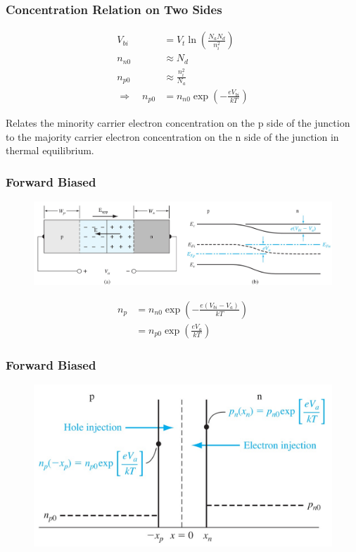 \documentclass{beamer}
\begin{document}
    \begin{frame} \frametitle{Concentration Relation on Two Sides}
        \begin{equation*}
            \begin{aligned}
                V_{bi} &= V_t \ln \left( \frac{N_a N_d}{n_i^2}  \right)\\
                n_{n0} & \approx N_d \\
                n_{p0} & \approx \frac{n_i^2}{N_a}  \\
                \Longrightarrow \quad n_{p0} &= n_{n0} \exp\left( -\frac{e V_{bi} }{kT}  \right)
            \end{aligned}
        \end{equation*}
        \par Relates the minority carrier electron concentration on the p side of the junction to the majority carrier electron concentration on the n side of the junction in thermal equilibrium.
    \end{frame}

    \begin{frame} \frametitle{Forward Biased}
        \begin{figure}[H]
            \centering
            \includegraphics[width=0.9\linewidth]{Forward-biased-equation.jpg}
            \label{fig:Forward-biased-equation.jpg}
        \end{figure}
        \begin{equation*}
            \begin{aligned}
                n_p &= n_{n0} \exp\left( -\frac{e (V_{bi} - V_a)}{kT}  \right) \\
                &= n_{p0} \exp\left( \frac{eV_a}{kT}  \right)
            \end{aligned}
        \end{equation*}
    \end{frame}
    \begin{frame} \frametitle{Forward Biased}
        \begin{figure}[H]
            \centering
            \includegraphics[width=0.8\linewidth]{Forward-biased-edge-concentration.jpg}
            \label{fig:Forward-biased-edge-concentration.jpg}
        \end{figure}
    \end{frame}
\end{document}
